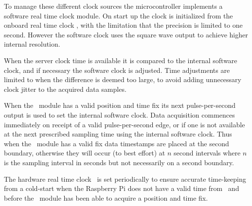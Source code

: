 To manage these different clock sources the microcontroller implements
a software real time clock module. On start up the clock is
initialized from the onboard real time clock \ic, with the limitation
that the precision is limited to one second. However the software
clock uses the  square wave output to achieve higher
internal resolution.

When the server clock time is available it is compared to the internal
software clock, and if necessary the software clock is adjusted. Time
adjustments are limited to when the difference is deemed too large, to
avoid adding unnecessary clock jitter to the acquired data samples.

When the \gnss\ module has a valid position and time fix its next
pulse-per-second output is used to set the internal software
clock. Data acquisition commences immediately on receipt of a valid
pulse-per-second edge, or if one is not available at the next
prescribed sampling time using the internal software clock. Thus when
the \gnss\ module has a valid fix data timestamps are placed at the
second boundary, otherwise they will occur (to best effort) at $n$
second intervals where $n$ is the sampling interval in seconds but not
necessarily on a second boundary.

The hardware real time clock \ic\ is set periodically to ensure
accurate time-keeping from a cold-start when the Raspberry Pi does not
have a valid time from \ntp\ and before the \gnss\ module has been
able to acquire a position and time fix.

